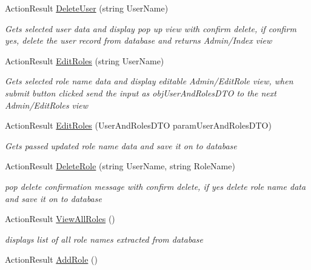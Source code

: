 \begin{DoxyCompactItemize}
Action\+Result \hyperlink{class_alfa_accounting_1_1_controllers_1_1_admin_controller_ab319343f23e122e5e097ab991d7b4570}{Delete\+User} (string User\+Name)
\begin{DoxyCompactList}\small\item\em Gets selected user data and display pop up view with confirm delete, if confirm yes, delete the user record from database and returns Admin/\+Index view \end{DoxyCompactList}\item 
Action\+Result \hyperlink{class_alfa_accounting_1_1_controllers_1_1_admin_controller_a39fd305b2aeaf168ce24304fea1fa3c5}{Edit\+Roles} (string User\+Name)
\begin{DoxyCompactList}\small\item\em Gets selected role name data and display editable Admin/\+Edit\+Role view, when submit button clicked send the input as obj\+User\+And\+Roles\+D\+TO to the next Admin/\+Edit\+Roles view \end{DoxyCompactList}\item 
Action\+Result \hyperlink{class_alfa_accounting_1_1_controllers_1_1_admin_controller_a47736fcfb27b8c74c6e19efbcf3752f0}{Edit\+Roles} (User\+And\+Roles\+D\+TO param\+User\+And\+Roles\+D\+TO)
\begin{DoxyCompactList}\small\item\em Gets passed updated role name data and save it on to database \end{DoxyCompactList}\item 
Action\+Result \hyperlink{class_alfa_accounting_1_1_controllers_1_1_admin_controller_aea25bbf8560b6a0906c84e09b0845508}{Delete\+Role} (string User\+Name, string Role\+Name)
\begin{DoxyCompactList}\small\item\em pop delete confirmation message with confirm delete, if yes delete role name data and save it on to database \end{DoxyCompactList}\item 
Action\+Result \hyperlink{class_alfa_accounting_1_1_controllers_1_1_admin_controller_ab80cc7f0ef15de30d04a72e93cb16a98}{View\+All\+Roles} ()
\begin{DoxyCompactList}\small\item\em displays list of all role names extracted from database \end{DoxyCompactList}\item 
Action\+Result \hyperlink{class_alfa_accounting_1_1_controllers_1_1_admin_controller_a59853ef1d5370e88b096ff325cd1ff6f}{Add\+Role} ()

\end{DoxyCompactItemize}
